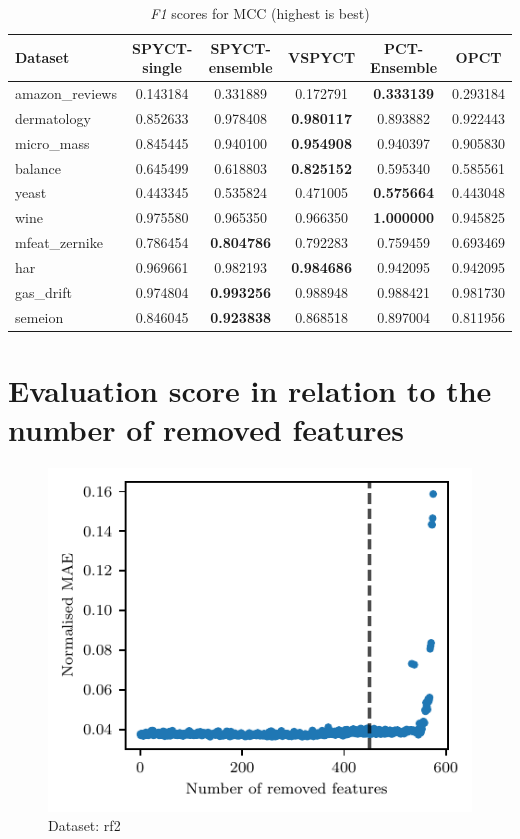 \documentclass[3p,review,authoryear]{elsarticle}
\begin{document}
\begin{table}[h!]
\centering
\caption{\textit{F1} scores for MCC (highest is best)}
\label{tab:mcc_results}
\begin{tabular}{@{}lccccc@{}}
\toprule
Dataset & SPYCT-single & SPYCT-ensemble & VSPYCT & PCT-Ensemble & OPCT \\ \midrule
amazon\_reviews & 0.143184 & 0.331889 & 0.172791 & \textbf{0.333139} & 0.293184 \\
dermatology      & 0.852633 & 0.978408 & \textbf{0.980117} & 0.893882 & 0.922443 \\
micro\_mass      & 0.845445 & 0.940100 & \textbf{0.954908} & 0.940397 & 0.905830 \\
balance          & 0.645499 & 0.618803 & \textbf{0.825152} & 0.595340 & 0.585561 \\
yeast            & 0.443345 & 0.535824 & 0.471005 & \textbf{0.575664} & 0.443048 \\
wine             & 0.975580 & 0.965350 & 0.966350 & \textbf{1.000000} & 0.945825 \\
mfeat\_zernike   & 0.786454 & \textbf{0.804786} & 0.792283 & 0.759459 & 0.693469 \\
har              & 0.969661 & 0.982193 & \textbf{0.984686} & 0.942095 & 0.942095 \\
gas\_drift        & 0.974804 & \textbf{0.993256} & 0.988948 & 0.988421 & 0.981730 \\
semeion          & 0.846045 & \textbf{0.923838} & 0.868518 & 0.897004 & 0.811956 \\
\bottomrule
\end{tabular}
\end{table}

\section{Evaluation score in relation to the number of removed features}

\begin{figure}[h!]
    \centering
    \includegraphics{loss_rf2.pdf}
    \caption{Dataset: rf2}
    \label{fig:loss_rf2}
\end{figure}
\end{document}
